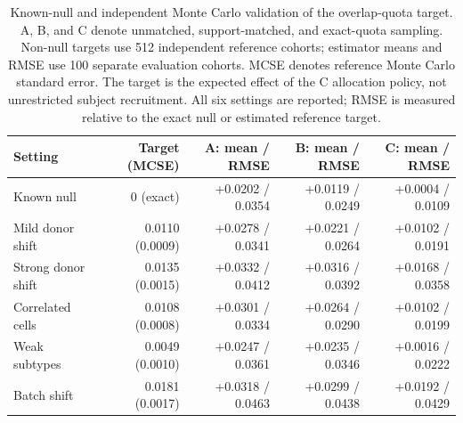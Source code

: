 \begin{table}[htbp]
\centering\small
\begin{tabular}{lrrrr}
\toprule
Setting & Target (MCSE) & A: mean / RMSE & B: mean / RMSE & C: mean / RMSE \\
\midrule
Known null & 0 (exact) & +0.0202 / 0.0354 & +0.0119 / 0.0249 & +0.0004 / 0.0109 \\
Mild donor shift & 0.0110 (0.0009) & +0.0278 / 0.0341 & +0.0221 / 0.0264 & +0.0102 / 0.0191 \\
Strong donor shift & 0.0135 (0.0015) & +0.0332 / 0.0412 & +0.0316 / 0.0392 & +0.0168 / 0.0358 \\
Correlated cells & 0.0108 (0.0008) & +0.0301 / 0.0334 & +0.0264 / 0.0290 & +0.0102 / 0.0199 \\
Weak subtypes & 0.0049 (0.0010) & +0.0247 / 0.0361 & +0.0235 / 0.0346 & +0.0016 / 0.0222 \\
Batch shift & 0.0181 (0.0017) & +0.0318 / 0.0463 & +0.0299 / 0.0438 & +0.0192 / 0.0429 \\
\bottomrule
\end{tabular}
\caption{Known-null and independent Monte Carlo validation of the overlap-quota target. A, B, and C denote unmatched, support-matched, and exact-quota sampling. Non-null targets use 512 independent reference cohorts; estimator means and RMSE use 100 separate evaluation cohorts. MCSE denotes reference Monte Carlo standard error. The target is the expected effect of the C allocation policy, not unrestricted subject recruitment. All six settings are reported; RMSE is measured relative to the exact null or estimated reference target.}
\label{tab:scaling_ground_truth}
\end{table}
